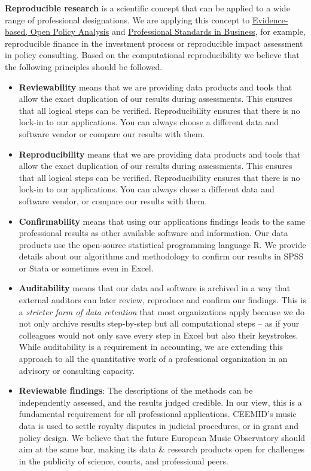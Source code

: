 \documentclass[
  a4paper,
  openany, a4paper, oneside]{book}
\begin{document}
\textbf{Reproducible research} is a scientific concept that can be applied to a wide range of professional designations. We are applying this concept to \protect\hyperlink{opa}{Evidence-based, Open Policy Analysis} and \protect\hyperlink{business-professional-standards}{Professional Standards in Business},
for example, reproducible finance in the investment process or reproducible impact assessment in policy consulting. Based on the computational reproducibility we believe that the following principles should be followed.

\begin{itemize}
\item
  \textbf{Reviewability} means that we are providing data products and tools that allow the exact duplication of our results during assessments. This ensures that all logical steps can be verified. Reproducibility ensures that there is no lock-in to our applications. You can always choose a different data and software vendor or compare our results with them.
\item
  \textbf{Reproducibility} means that we are providing data products and tools that allow the exact duplication of our results during assessments. This ensures that all logical steps can be verified. Reproducibility ensures that there is no lock-in to our applications. You can always chose a different data and software vendor, or compare our results with them.
\item
  \textbf{Confirmability} means that using our applications findings leads to the same professional results as other available software and information. Our data products use the open-source statistical programming language R. We provide details about our algorithms and methodology to confirm our results in SPSS or Stata or sometimes even in Excel.
\item
  \textbf{Auditability} means that our data and software is archived in a way that external auditors can later review, reproduce and confirm our findings. This is a \emph{stricter form of data retention} that most organizations apply because we do not only archive results step-by-step but all computational steps -- as if your colleagues would not only save every step in Excel but also their keystrokes. While auditability is a requirement in accounting, we are extending this approach to all the quantitative work of a professional organization in an advisory or consulting capacity.
\item
  \textbf{Reviewable findings}: The descriptions of the methods can be independently assessed, and the results judged credible. In our view, this is a fundamental requirement for all professional applications. CEEMID's music data is used to settle royalty disputes in judicial procedures, or in grant and policy design. We believe that the future European Music Observatory should aim at the same bar, making its data \& research products open for challenges in the publicity of science, courts, and professional peers.

\end{itemize}
\end{document}
